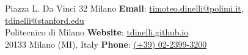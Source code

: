 Piazza L. Da Vinci 32 Milano \hfill \textbf{Email}:
\href{mailto:timoteo.dinelli@polimi.it}{timoteo.dinelli@polimi.it},
\href{mailto:tdinelli@stanford.edu}{tdinelli@stanford.edu}\\
Politecnico di Milano   \hfill \textbf{Website}: \href{https://tdinelli.github.io}{tdinelli.github.io}\\
20133 Milano (MI), Italy  \hfill \textbf{Phone}: \href{tel:+390223993200}{(+39) 02-2399-3200}\\
